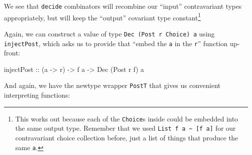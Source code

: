 \documentclass[]{article}
\newenvironment{Shaded}{}{}
\newcommand{\DataTypeTok}[1]{\textcolor[rgb]{0.56,0.13,0.00}{#1}}
\newcommand{\NormalTok}[1]{#1}
\newcommand{\OtherTok}[1]{\textcolor[rgb]{0.00,0.44,0.13}{#1}}
\begin{document}
We see that \texttt{decide} combinators will recombine our ``input''
contravariant types appropriately, but will keep the ``output'' covariant type
constant\footnote{This works out because each of the \texttt{Choice}s inside
  could be embedded into the same output type. Remember that we used
  \texttt{List\ f\ a\ \textasciitilde{}\ {[}f\ a{]}} for our contravariant
  choice collection before, just a list of things that produce the same
  \texttt{a}.}

Again, we can construct a value of type \texttt{Dec\ (Post\ r\ Choice)\ a} using
\texttt{injectPost}, which asks us to provide that ``embed the \texttt{a} in the
\texttt{r}'' function up-front:

\begin{Shaded}
\begin{Highlighting}[]
\OtherTok{injectPost ::}\NormalTok{ (a }\OtherTok{{-}>}\NormalTok{ r) }\OtherTok{{-}>}\NormalTok{ f a }\OtherTok{{-}>} \DataTypeTok{Dec}\NormalTok{ (}\DataTypeTok{Post}\NormalTok{ r f) a}
\end{Highlighting}
\end{Shaded}

And again, we have the newtype wrapper \texttt{PostT} that gives us convenient
interpreting functions:
\end{document}
